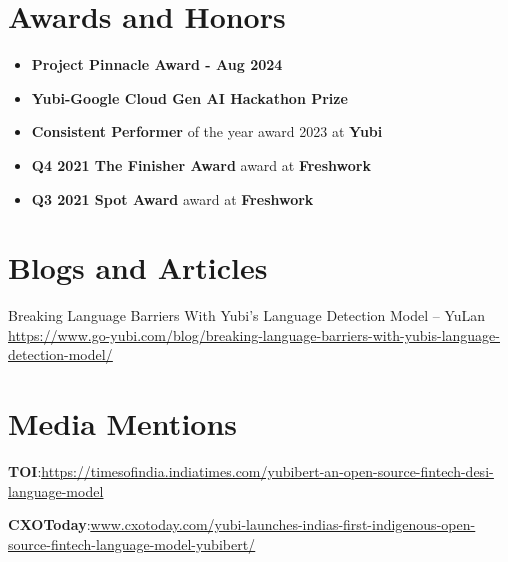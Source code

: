 \documentclass[letterpaper,11pt]{article}
\newcommand{\resumeItem}[1]{
  \item\small{
    {#1 \vspace{-2pt}}
  }
}
\newcommand{\resumeItemListStart}{\begin{itemize}}
\newcommand{\resumeItemListEnd}{\end{itemize}\vspace{-5pt}}
\begin{document}
\section{Awards and Honors}
 \resumeItemListStart
           \resumeItem{\textbf{Project Pinnacle Award - Aug 2024}}
          \resumeItem{\textbf{Yubi-Google Cloud Gen AI Hackathon Prize}}
          \resumeItem{\textbf{Consistent Performer} of the year award 2023 at \textbf{Yubi}}
          \resumeItem{\textbf{Q4 2021 The Finisher Award} award at \textbf{Freshwork}}
        \resumeItem{\textbf{Q3 2021 Spot Award} award at \textbf{Freshwork}}
         
      \resumeItemListEnd

\section{Blogs and Articles}
{Breaking Language Barriers With Yubi’s Language Detection Model – YuLan} \href{https://www.go-yubi.com/blog/breaking-language-barriers-with-yubis-language-detection-model/} {\underline{https://www.go-yubi.com/blog/breaking-language-barriers-with-yubis-language-detection-model/}}
\section{Media Mentions}
{\textbf{TOI}:}\href{https://timesofindia.indiatimes.com/business/startups/companies/meet-yubibert-an-open-source-fintech-desi-language-model/articleshow/99600938.cms?from=mdr} {\underline{https://timesofindia.indiatimes.com/yubibert-an-open-source-fintech-desi-language-model}}
\vspace{4pt}


{\textbf{CXOToday}:}\href{https://www.cxotoday.com/press-release/yubi-launches-indias-first-indigenous-open-source-fintech-language-model-yubibert/} {\underline{www.cxotoday.com/yubi-launches-indias-first-indigenous-open-source-fintech-language-model-yubibert/}}
 
\end{document}
